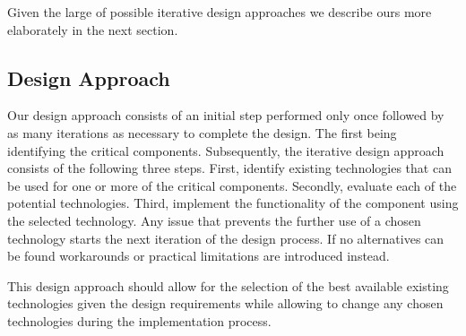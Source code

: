 Given the large of possible iterative design approaches we describe ours
more elaborately in the next section.

\subsection{Design Approach}

Our design approach consists of an initial step performed only once followed by
as many iterations as necessary to complete the design. The first being
identifying the critical components. Subsequently, the iterative design approach
consists of the following three steps. First, identify existing technologies
that can be used for one or more of the critical components. Secondly,
evaluate each of the potential technologies. Third, implement the
functionality of the component using the selected technology. Any issue that
prevents the further use of a chosen technology starts the next iteration of the
design process. If no alternatives can be found workarounds or practical
limitations are introduced instead.

This design approach should allow for the selection of the best available
existing technologies given the design requirements while allowing to change
any chosen technologies during the implementation process.
